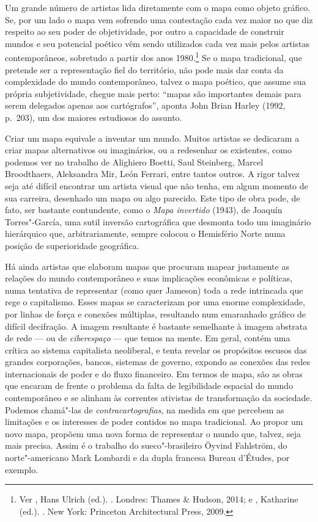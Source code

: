 Um grande número de artistas lida diretamente com o mapa como objeto
gráfico. Se, por um lado o mapa vem sofrendo uma contestação cada vez
maior no que diz respeito ao seu poder de objetividade, por outro a
capacidade de construir mundos e seu potencial poético vêm sendo
utilizados cada vez mais pelos artistas contemporâneos, sobretudo a
partir dos anos 1980.\footnote{Ver , Hans Ulrich
  (ed.). {}. Londres: Thames \& Hudson, 2014; e , Katharine
  (ed.). {}. New York: Princeton Architectural Press, 2009.} Se o mapa
tradicional, que pretende ser a representação fiel do território, não
pode mais dar conta da complexidade do mundo contemporâneo, talvez o
mapa poético, que assume sua própria subjetividade, chegue mais perto:
``mapas são importantes demais para serem delegados apenas aos
cartógrafos'', aponta John Brian Harley (1992, p.~203), um dos maiores
estudiosos do assunto.

Criar um mapa equivale a inventar um mundo. Muitos artistas se dedicaram
a criar mapas alternativos ou imaginários, ou a redesenhar os
existentes, como podemos ver no trabalho de Alighiero Boetti, Saul
Steinberg, Marcel Broodthaers, Aleksandra Mir, León Ferrari, entre
tantos outros. A rigor talvez seja até difícil encontrar um artista
visual que não tenha, em algum momento de sua carreira, desenhado um
mapa ou algo parecido. Este tipo de obra pode, de fato, ser bastante
contundente, como o \emph{Mapa invertido} (1943), de Joaquín
Torres"-García, uma sutil inversão cartográfica que desmonta todo um
imaginário hierárquico que, arbitrariamente, sempre colocou o Hemisfério
Norte numa posição de superioridade geográfica.

Há ainda artistas que elaboram mapas que procuram mapear justamente as
relações do mundo contemporâneo e suas implicações econômicas e
políticas, numa tentativa de representar (como quer Jameson) toda a rede
intrincada que rege o capitalismo. Esses mapas se caracterizam por uma
enorme complexidade, por linhas de força e conexões múltiplas,
resultando num emaranhado gráfico de difícil decifração. A imagem
resultante é bastante semelhante à imagem abstrata de rede --- ou de
\emph{ciberespaço} --- que temos na mente. Em geral, contém uma crítica
ao sistema capitalista neoliberal, e tenta revelar os propósitos escusos
das grandes corporações, bancos, sistemas de governo, expondo as
conexões das redes internacionais de poder e do fluxo financeiro. Em
termos de mapa, são as obras que encaram de frente o problema da falta
de legibilidade espacial do mundo contemporâneo e se alinham às
correntes ativistas de transformação da sociedade. Podemos chamá"-las de
\emph{contracartografias}, na medida em que percebem as limitações e os
interesses de poder contidos no mapa tradicional. Ao propor um novo
mapa, propõem uma nova forma de representar o mundo que, talvez, seja
mais precisa. Assim é o trabalho do sueco"-brasileiro Öyvind Fahlström,
do norte"-americano Mark Lombardi e da dupla francesa Bureau d'Études,
por exemplo.

